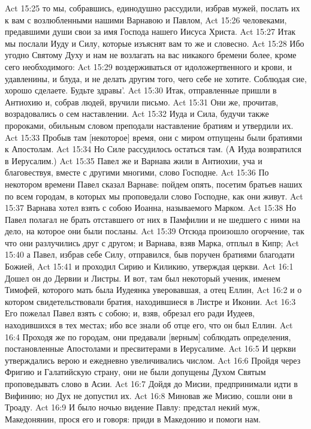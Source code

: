 Act 15:25  то мы, собравшись, единодушно рассудили, избрав мужей, послать их к вам с возлюбленными нашими Варнавою и Павлом,
Act 15:26  человеками, предавшими души свои за имя Господа нашего Иисуса Христа.
Act 15:27  Итак мы послали Иуду и Силу, которые изъяснят вам то же и словесно.
Act 15:28  Ибо угодно Святому Духу и нам не возлагать на вас никакого бремени более, кроме сего необходимого:
Act 15:29  воздерживаться от идоложертвенного и крови, и удавленины, и блуда, и не делать другим того, чего себе не хотите. Соблюдая сие, хорошо сделаете. Будьте здравы'.
Act 15:30  Итак, отправленные пришли в Антиохию и, собрав людей, вручили письмо.
Act 15:31  Они же, прочитав, возрадовались о сем наставлении.
Act 15:32  Иуда и Сила, будучи также пророками, обильным словом преподали наставление братиям и утвердили их.
Act 15:33  Пробыв там [некоторое] время, они с миром отпущены были братиями к Апостолам.
Act 15:34  Но Силе рассудилось остаться там. (А Иуда возвратился в Иерусалим.)
Act 15:35  Павел же и Варнава жили в Антиохии, уча и благовествуя, вместе с другими многими, слово Господне.
Act 15:36  По некотором времени Павел сказал Варнаве: пойдем опять, посетим братьев наших по всем городам, в которых мы проповедали слово Господне, как они живут.
Act 15:37  Варнава хотел взять с собою Иоанна, называемого Марком.
Act 15:38  Но Павел полагал не брать отставшего от них в Памфилии и не шедшего с ними на дело, на которое они были посланы.
Act 15:39  Отсюда произошло огорчение, так что они разлучились друг с другом; и Варнава, взяв Марка, отплыл в Кипр;
Act 15:40  а Павел, избрав себе Силу, отправился, быв поручен братиями благодати Божией,
Act 15:41  и проходил Сирию и Киликию, утверждая церкви.
Act 16:1  Дошел он до Дервии и Листры. И вот, там был некоторый ученик, именем Тимофей, которого мать была Иудеянка уверовавшая, а отец Еллин,
Act 16:2  и о котором свидетельствовали братия, находившиеся в Листре и Иконии.
Act 16:3  Его пожелал Павел взять с собою; и, взяв, обрезал его ради Иудеев, находившихся в тех местах; ибо все знали об отце его, что он был Еллин.
Act 16:4  Проходя же по городам, они предавали [верным] соблюдать определения, постановленные Апостолами и пресвитерами в Иерусалиме.
Act 16:5  И церкви утверждались верою и ежедневно увеличивались числом.
Act 16:6  Пройдя через Фригию и Галатийскую страну, они не были допущены Духом Святым проповедывать слово в Асии.
Act 16:7  Дойдя до Мисии, предпринимали идти в Вифинию; но Дух не допустил их.
Act 16:8  Миновав же Мисию, сошли они в Троаду.
Act 16:9  И было ночью видение Павлу: предстал некий муж, Македонянин, прося его и говоря: приди в Македонию и помоги нам.
